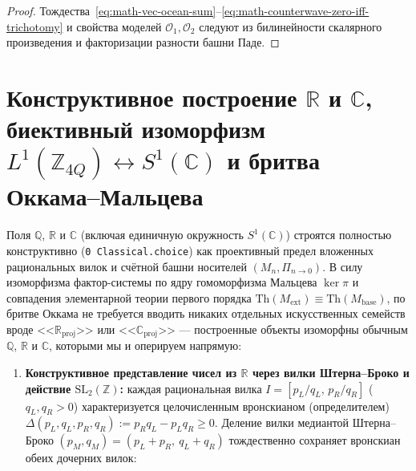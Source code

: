 \begin{proof}
\leanok
Тождества~\eqref{eq:math-vec-ocean-sum}--\eqref{eq:math-counterwave-zero-iff-trichotomy} и свойства моделей $\mathcal{O}_1, \mathcal{O}_2$ следуют из билинейности скалярного произведения и факторизации разности башни Паде.
\end{proof}

\section{Конструктивное построение \texorpdfstring{$\mathbb{R}$ и $\mathbb{C}$}{R and C}, биективный изоморфизм \texorpdfstring{$L^1(\mathbb{Z}_{4Q}) \leftrightarrow S^1(\mathbb{C})$}{L1 <-> S1(C)} и бритва Оккама--Мальцева}

\begin{theorem}
\label{thm:math-constructive-reals-s1-malcev-limit}
\leanok
Поля $\mathbb{Q}$, $\mathbb{R}$ и $\mathbb{C}$ (включая единичную окружность $S^1(\mathbb{C})$) строятся полностью конструктивно (\texttt{0 Classical.choice}) как проективный предел вложенных рациональных вилок и счётной башни носителей $(M_n, \Pi_{n\to 0})$. В силу изоморфизма фактор-системы по ядру гомоморфизма Мальцева $\ker\pi$ и совпадения элементарной теории первого порядка $\mathrm{Th}(M_{\mathrm{ext}}) \equiv \mathrm{Th}(M_{\mathrm{base}})$, по бритве Оккама не требуется вводить никаких отдельных искусственных семейств вроде <<$\mathbb{R}_{\mathrm{proj}}$>> или <<$\mathbb{C}_{\mathrm{proj}}$>> --- построенные объекты изоморфны обычным $\mathbb{Q}$, $\mathbb{R}$ и $\mathbb{C}$, которыми мы и оперируем напрямую:
\begin{enumerate}[label=\textbf{(\arabic*)},leftmargin=*]
\item \textbf{Конструктивное представление чисел из $\mathbb{R}$ через вилки Штерна--Броко и действие $\mathrm{SL}_2(\mathbb{Z})$:}
  каждая рациональная вилка $I = [p_L/q_L,\, p_R/q_R]$ ($q_L, q_R > 0$) характеризуется целочисленным вронскианом (определителем) $\Delta(p_L, q_L, p_R, q_R) := p_R q_L - p_L q_R \ge 0$. Деление вилки медиантой Штерна--Броко $(p_M, q_M) = (p_L + p_R,\ q_L + q_R)$ тождественно сохраняет вронскиан обеих дочерних вилок:

\end{enumerate}
\end{theorem}
